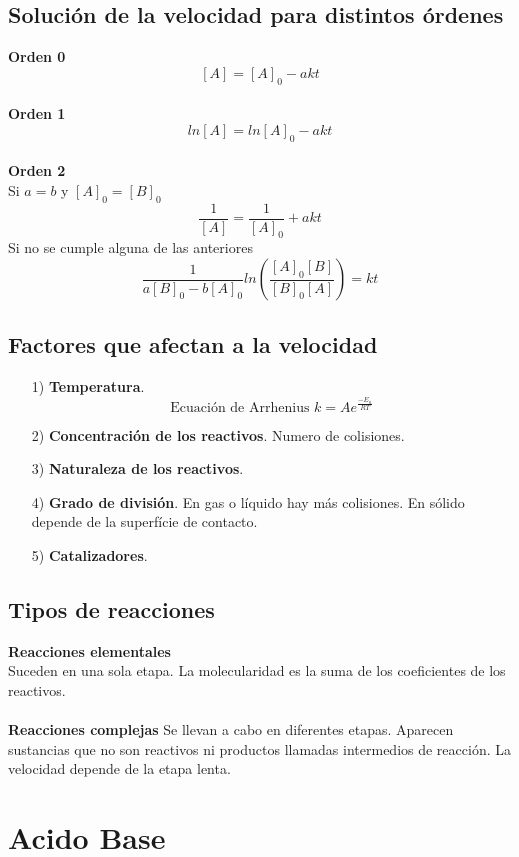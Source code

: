 \documentclass[12pt]{article}
\begin{document}
	\subsection{Solución de la velocidad para distintos órdenes}
	\textbf{Orden 0}
	\[[A]=[A]_0-akt\]
	\\
	\textbf{Orden 1}
	\[ln[A]=ln[A]_0-akt\]
	\\
	\textbf{Orden 2} \\
	Si $a=b$ y $[A]_0=[B]_0$
	\[\frac{1}{[A]}=\frac{1}{[A]_0}+akt\]
	Si no se cumple alguna de las anteriores
	\[\frac{1}{a[B]_0-b[A]_0}ln\left(\frac{[A]_0[B]}{[B]_0[A]}\right)=kt\]
	
	\subsection{Factores que afectan a la velocidad}
	\begin{itemize}
		\item[1)] \textbf{Temperatura}.
		\[\text{Ecuación de Arrhenius   } k= Ae^{\frac{-E_a}{RT}}\]
		\item[2)] \textbf{Concentración de los reactivos}. Numero de colisiones.
		\item[3)] \textbf{Naturaleza de los reactivos}.
		\item[4)] \textbf{Grado de división}. En gas o líquido hay más colisiones. En sólido depende de la superfície de contacto.
		\item[5)] \textbf{Catalizadores}.
	\end{itemize}
	
	\subsection{Tipos de reacciones}
	\textbf{Reacciones elementales}\\
	Suceden en una sola etapa. La molecularidad es la suma de los coeficientes de los reactivos. \\
	\\
	\textbf{Reacciones complejas}
	Se llevan a cabo en diferentes etapas. Aparecen sustancias que no son reactivos ni productos llamadas intermedios de reacción. La velocidad depende de la etapa lenta.
	
\section{Acido Base}
\end{document}
